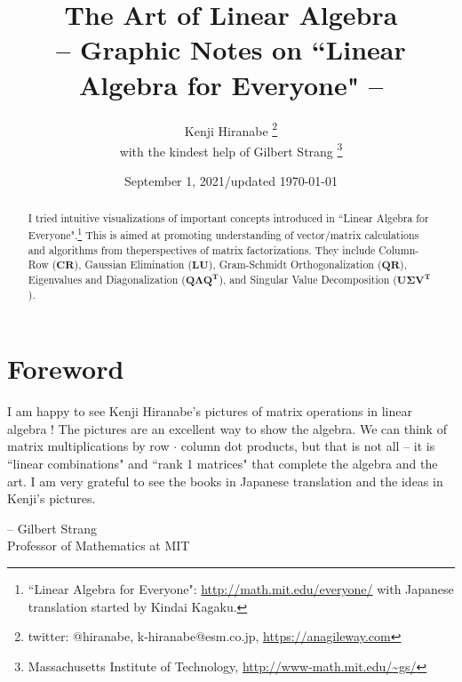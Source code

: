 \documentclass[letterpaper]{article}
\begin{document}
\title{The Art of Linear Algebra\\
\vspace{5pt}
\large{
-- Graphic Notes on ``Linear Algebra for Everyone" --
}
}

\author{Kenji Hiranabe
\thanks{twitter: @hiranabe, k-hiranabe@esm.co.jp, \url{https://anagileway.com}} \\
with the kindest help of Gilbert Strang
\thanks{Massachusetts Institute of Technology, \url{http://www-math.mit.edu/\~gs/}}
}

\date{September 1, 2021/updated \today}

\maketitle

\vspace{-5pt}
 
\begin{abstract}
I tried intuitive visualizations of important concepts introduced
in ``Linear Algebra for Everyone".\footnote{``Linear Algebra for Everyone":
\url{http://math.mit.edu/everyone/} with Japanese translation started by Kindai Kagaku.}\linebreak
This is aimed at promoting understanding of vector/matrix calculations
and algorithms from the\linebreak perspectives of matrix factorizations.
They include Column-Row ($\bm{CR}$), Gaussian Elimination ($\bm{LU}$),
Gram-Schmidt Orthogonalization ($\bm{QR}$), Eigenvalues and Diagonalization ($\bm{Q \Lambda Q^\mathbf{T}}$),
and Singular Value Decomposition ($\bm{U \Sigma V^\mathbf{T}}$).
\end{abstract}

\section*{Foreword}
I am happy to see Kenji Hiranabe's pictures of matrix operations in linear algebra !
The pictures are an excellent way to show the algebra.  We can think of matrix
multiplications by row $\bm{\cdot}$ column dot products, but that is not all --  it is ``linear combinations"
and ``rank 1 matrices" that complete the algebra and the art.
I am very grateful to see the books in Japanese translation
and the ideas in Kenji's pictures.
\begin{flushright}
-- Gilbert Strang \\ Professor of Mathematics at MIT
\end{flushright}
\end{document}
